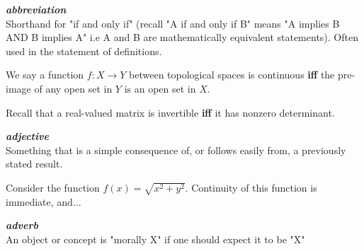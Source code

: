 \documentclass[12pt,x11names]{article}
\begin{document}
\begin{definition}
    
\end{definition}

\begin{definition}[Identity]
    
\end{definition}

\begin{definition}[Iff]
\textbf{\textit{abbreviation}}\\
Shorthand for "if and only if" (recall "A if and only if B" means "A implies B AND B implies A" i.e A and B are mathematically equivalent statements). Often used in the statement of definitions.
\end{definition}

\begin{example}
We say a function $f: X \to Y$ between topological spaces is continuous \textbf{iff} the pre-image of any open set in $Y$ is an open set in $X$.
\end{example}

\begin{example}
Recall that a real-valued matrix is invertible \textbf{iff} it has nonzero determinant.
\end{example}


\begin{definition}[Immediate]
\textbf{\textit{adjective}}\\
Something that is a simple consequence of, or follows easily from, a previously stated result.
\end{definition}
\begin{example}
    Consider the function $f(x) = \sqrt{x^2 + y^2}$. Continuity of this function is immediate, and...
\end{example}


\begin{definition}[Inspection]
    
\end{definition}

\begin{definition}
    
\end{definition}

\begin{definition}[Modulo]
    
\end{definition}

\begin{definition}[Morally]
\textbf{\textit{adverb}}\\
An object or concept is "morally X" if one should expect it to be "X" 
    
\end{definition}
\end{document}
